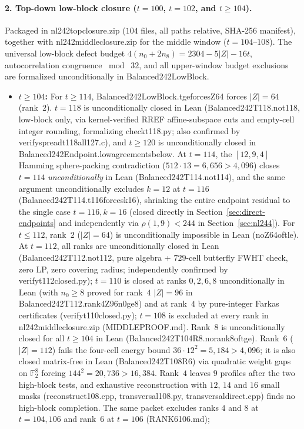 \documentclass[11pt]{article}
\theoremstyle{definition}
\newcommand{\F}{\mathbb{F}}
\newcommand{\code}[1]{{\ttfamily\small\renewcommand{\_}{\textunderscore\allowbreak}#1}}
\begin{document}
\paragraph{2. Top-down low-block closure ($t = 100$, $t = 102$, and $t \ge 104$).}
Packaged in \code{nl242\_top\_closure.zip} ($104$ files, all paths relative, SHA-256 manifest), together with \code{nl242\_middle\_closure.zip} for the middle window ($t = 104$--$108$).
The universal low-block defect budget $4(n_0 + 2n_8) = 2304 - 5|Z| - 16t$, autocorrelation congruence $\bmod\;32$, and all upper-window budget exclusions are formalized unconditionally in \code{Balanced242LowBlock}.
\begin{itemize}[nosep]
  \item \textbf{$t \ge 104$:}
    For $t \ge 114$, \code{Balanced242LowBlock.t\_ge\_114\_forces\_Z64} forces $|Z| = 64$ (rank~$2$).
    $t = 118$ is unconditionally closed in Lean (\code{Balanced242T118.no\_t118}, low-block only, via kernel-verified RREF affine-subspace cuts and empty-cell integer rounding, formalizing \code{check\_t118.py}; also confirmed by \code{verify\_spread\_t118\_all127.c}), and $t \ge 120$ is unconditionally closed in \code{Balanced242Endpoint.low\_agreements\_below\_120}.
    At $t = 114$, the $[12,9,4]$ Hamming sphere-packing contradiction ($512 \cdot 13 = 6{,}656 > 4{,}096$) closes $t = 114$ \emph{unconditionally} in Lean (\code{Balanced242T114.no\_t114}), and the same argument unconditionally excludes $k = 12$ at $t = 116$ (\code{Balanced242T114.t116\_forces\_k16}), shrinking the entire endpoint residual to the single case $t = 116, k = 16$ (closed directly in Section~\ref{sec:direct-endpoints} and independently via $\rho(1,9) < 244$ in Section~\ref{sec:nl244}).
    For $t \le 112$, rank~$2$ ($|Z| = 64$) is unconditionally impossible in Lean (\code{no\_Z64\_of\_t\_le\_112}).
    At $t = 112$, all ranks are unconditionally closed in Lean (\code{Balanced242T112.no\_t112}, pure algebra + $729$-cell butterfly FWHT check, zero LP, zero covering radius; independently confirmed by \code{verify\_t112\_closed.py});
    $t = 110$ is closed at ranks $0,2,6,8$ unconditionally in Lean (with $n_0 \ge 8$ proved for rank~$4$ $|Z|=96$ in \code{Balanced242T112.rank4\_Z96\_n0\_ge8}) and at rank~$4$ by pure-integer Farkas certificates (\code{verify\_t110\_closed.py});
    $t = 108$ is excluded at every rank in \code{nl242\_middle\_closure.zip} (\code{MIDDLE\_PROOF.md}). Rank~$8$ is unconditionally closed for all $t \ge 104$ in Lean (\code{Balanced242T104R8.no\_rank8\_of\_t\_ge\_104}). Rank~$6$ ($|Z| = 112$) fails the four-cell energy bound $36 \cdot 12^2 = 5{,}184 > 4{,}096$; it is also closed matrix-free in Lean (\code{Balanced242T108R6}) via quadratic weight gaps on $\F_2^8$ forcing $144^2 = 20{,}736 > 16{,}384$. Rank~$4$ leaves $9$ profiles after the two high-block tests, and exhaustive reconstruction with $12$, $14$ and $16$ small masks (\code{reconstruct\_108.cpp}, \code{transversal\_108.py}, \code{transversal\_direct.cpp}) finds no high-block completion. The same packet excludes ranks $4$ and $8$ at $t = 104, 106$ and rank~$6$ at $t = 106$ (\code{RANK6\_106.md});

\end{itemize}
\end{document}
